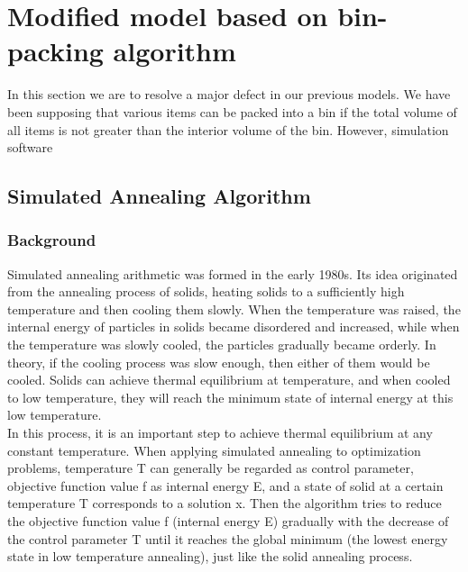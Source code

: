 \documentclass{mcmthesis}
\begin{document}
\section{Modified model based on bin-packing algorithm}

In this section we are to resolve a major defect in our previous models. We have been supposing that various items can be packed into a bin if the total volume of all items is not greater than the interior volume of the bin. However, simulation software  

\subsection{Simulated Annealing Algorithm}
\subsubsection{Background}
Simulated annealing arithmetic was formed in the early 1980s. Its idea originated from the annealing process of solids, heating solids to a sufficiently high temperature and then cooling them slowly. When the temperature was raised, the internal energy of particles in solids became disordered and increased, while when the temperature was slowly cooled, the particles gradually became orderly. In theory, if the cooling process was slow enough, then either of them would be cooled. Solids can achieve thermal equilibrium at temperature, and when cooled to low temperature, they will reach the minimum state of internal energy at this low temperature. \\     

In this process, it is an important step to achieve thermal equilibrium at any constant temperature. When applying simulated annealing to optimization problems, temperature T can generally be regarded as control parameter, objective function value f as internal energy E, and a state of solid at a certain temperature T corresponds to a solution x. Then the algorithm tries to reduce the objective function value f (internal energy E) gradually with the decrease of the control parameter T until it reaches the global minimum (the lowest energy state in low temperature annealing), just like the solid annealing process.\\
\end{document}
